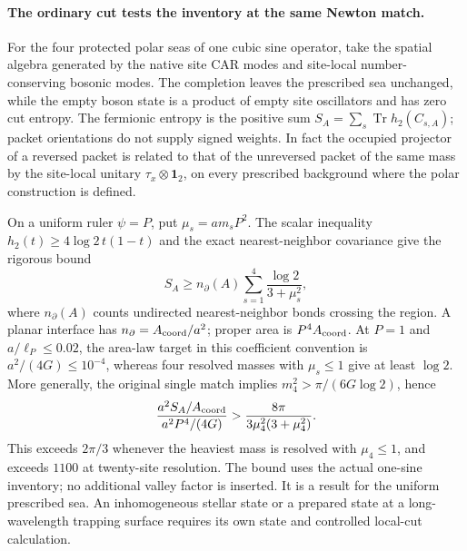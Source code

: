 
\paragraph{The ordinary cut tests the inventory at the same Newton match.}
For the four protected polar seas of one cubic sine operator, take the
spatial algebra generated by the native site CAR modes and site-local
number-conserving bosonic modes. The completion leaves the prescribed
sea unchanged, while the empty boson state is a product of empty site
oscillators and has zero cut entropy. The fermionic entropy is the
positive sum $S_A=\sum_s\operatorname{Tr}h_2(C_{s,A})$; packet orientations
do not supply signed weights. In fact the occupied projector of a reversed
packet is related to that of the unreversed packet of the same mass by
the site-local unitary $\tau_x\otimes\mathbf1_2$, on every prescribed
background where the polar construction is defined.

On a uniform ruler $\psi=P$, put $\mu_s=am_sP^2$. The scalar inequality
$h_2(t)\geq4\log2\,t(1-t)$ and the exact nearest-neighbor covariance
give the rigorous bound
\[
 S_A\geq n_\partial(A)\sum_{s=1}^4\frac{\log2}{3+\mu_s^2},
\]
where $n_\partial(A)$ counts undirected nearest-neighbor bonds crossing
the region. A planar interface has $n_\partial=A_{\rm coord}/a^2$;
proper area is $P^4A_{\rm coord}$. At $P=1$ and
$a/\ell_P\leq0.02$, the area-law target in this coefficient convention
is $a^2/(4G)\leq10^{-4}$, whereas four resolved masses with
$\mu_s\leq1$ give at least $\log2$. More generally, the original
single match implies $m_4^2>\pi/(6G\log2)$, hence
\[
 \frac{a^2S_A/A_{\rm coord}}{a^2P^4/(4G)}
 >\frac{8\pi}{3\mu_4^2(3+\mu_4^2)}.
\]
This exceeds $2\pi/3$ whenever the heaviest mass is resolved with
$\mu_4\leq1$, and exceeds $1100$ at twenty-site resolution. The bound
uses the actual one-sine inventory; no additional valley factor is
inserted. It is a result for the uniform prescribed sea. An inhomogeneous
stellar state or a prepared state at a long-wavelength trapping surface
requires its own state and controlled local-cut calculation.

